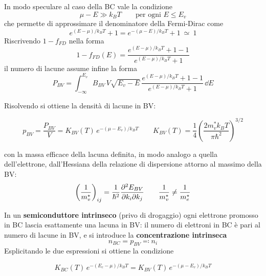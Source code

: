 In modo speculare al caso della BC vale la condizione
\begin{equation}
    \mu - E \gg k_B T \qquad \text{per ogni } E \le E_v
\end{equation}
che permette di approssimare il denominatore della Fermi-Dirac come
\begin{equation}
    e^{(E - \mu)/k_B T} + 1 = e^{-(\mu - E)/k_B T} + 1 \ \simeq \ 1
\end{equation}
Riscrivendo \( 1 - f_{FD} \) nella forma
\begin{equation}
    1 - f_{FD}(E) = \frac{e^{(E - \mu)/k_B T} + 1 - 1}{e^{(E - \mu)/k_B T} + 1}
\end{equation}
il numero di lacune assume infine la forma
\begin{equation}
    P_{BV} = \int_{-\infty}^{E_v} B_{BV} \, V \sqrt{E_v - E} \, \frac{e^{(E - \mu)/k_B T} + 1 - 1}{e^{(E - \mu)/k_B T} + 1} \, \dd E
\end{equation}

Risolvendo si ottiene la densità di lacune in BV:
\begin{importantbox}
    \begin{equation}
        p_{BV} = \frac{P_{BV}}{V} = K_{BV}(T) \, e^{-(\mu - E_v)/k_B T}
        \qquad
        K_{BV}(T) = \frac{1}{4} \left( \frac{2 m_v^* k_B T}{\pi \hbar^2} \right)^{3/2}
    \end{equation}
\end{importantbox}
con la massa efficace della lacuna definita, in modo analogo a quella dell'elettrone, dall'Hessiana della relazione di dispersione attorno al massimo della BV:
\begin{equation}
    \left( \frac{1}{m_v^*} \right)_{ij} = \frac{1}{\hbar^2} \pdv{E_{BV}}{k_i}{k_j} \qquad \frac{1}{m_v^*} \ne \frac{1}{m_e^*}
\end{equation}

In un \textbf{semiconduttore intrinseco} (privo di drogaggio) ogni elettrone promosso in BC lascia esattamente una lacuna in BV: il numero di elettroni in BC è pari al numero di lacune in BV, e si introduce la \textbf{concentrazione intrinseca}
\begin{equation}
    n_{BC} = p_{BV} \eqqcolon n_i
\end{equation}
Esplicitando le due espressioni si ottiene la condizione
\begin{importantbox}
    \begin{equation}
        K_{BC}(T) \, e^{-(E_c - \mu)/k_B T} = K_{BV}(T) \, e^{-(\mu - E_v)/k_B T}
    \end{equation}
\end{importantbox}

